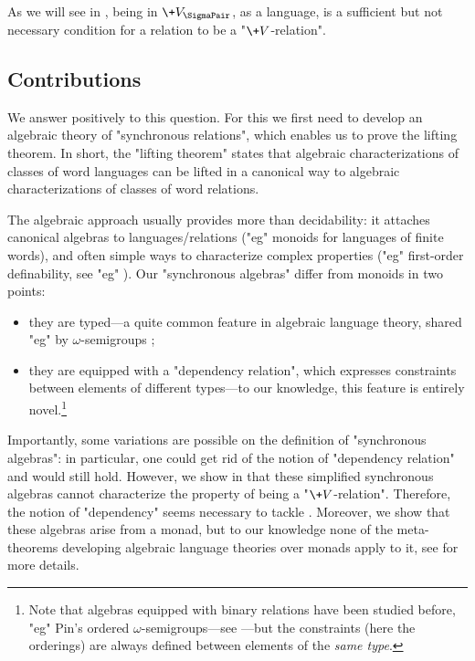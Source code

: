 As we will see in , being in $\+V_{\SigmaPair}$, as a language,
is a sufficient but not necessary condition for a relation to be a "$\+V$-relation".

\subsection{Contributions}

We answer positively to this question.
For this we first need to develop an algebraic theory of "synchronous relations",
which enables us to prove the lifting theorem. In short, the "lifting theorem" states that algebraic characterizations of classes of word languages can be lifted in a canonical way to algebraic characterizations of classes of word relations.

The algebraic approach usually provides more than decidability: it attaches
canonical algebras to languages/relations ("eg" monoids for languages of finite words), and often simple ways to characterize complex properties ("eg" first-order definability, see "eg" \cite[Theorem 2.6, p.~40]{Bojanczyk2020MSO}).
Our "synchronous algebras" differ from monoids in two points:
\begin{itemize}
	\item they are typed---a quite common feature in algebraic language theory, shared "eg" by $\omega$-semigroups \cite[\S 4.1, p.~91]{Perrin2004InfiniteWords};
	\item they are equipped with a "dependency relation", which expresses constraints between 
	elements of different types---to our knowledge, this feature is entirely novel.\footnote{Note that algebras equipped with binary relations have been studied before, "eg" Pin's ordered 
	$\omega$-semigroups---see \cite[\S 2.4, p.~7]{Pin1998PositiveVarieties}---but the constraints (here the 
	orderings) are always defined between elements of the \emph{same type}.}
\end{itemize}

Importantly, some variations are possible on the definition of "synchronous algebras":
in particular, one could get rid of the notion of "dependency relation" and 
 would still hold.
However, we show in  that these
simplified synchronous algebras cannot characterize the property of being a "$\+V$-relation".
Therefore, the notion of "dependency" seems necessary to tackle .
Moreover, we show that these algebras arise from a monad, but to our knowledge none of the 
meta-theorems developing algebraic language theories over monads apply to it,
see  for more details.

